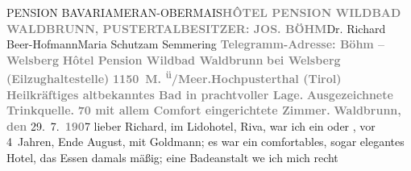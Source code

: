 \begin{ledgroupsized}[t]{13cm}
{{                           PENSION BAVARIAMERAN-OBERMAIS}}\pend{}\pstart{}\textcolor{gray}{\textbf{HÔTEL {\kaufmannsund} PENSION WILDBAD WALDBRUNN, PUSTERTAL}}\pend{}\pstart{}\textcolor{gray}{\textbf{BESITZER: JOS. BÖHM}}\pend{}{\bigskip}\pstart{}Dr. Richard Beer-Hofmann\pend{}\pstart{}Maria Schutz\pend{}\pstart{}am Semmering\pend{}{\bigskip}\pstart
           \noindent{}{\pb}\textcolor{gray}{\textbf{Telegramm-Adresse: Böhm – Welsberg}}\pend
           \pstart
           \textcolor{gray}{\textbf{Hôtel {\kaufmannsund} Pension Wildbad Waldbrunn}}\pend
           \pstart
           \textcolor{gray}{\textbf{bei Welsberg
                     (Eilzughaltestelle)}}\pend
           \pstart
           \textcolor{gray}{\textbf{1150 M. \textsuperscript{ü}/Meer.\hspace*{1.5em}Hochpusterthal (Tirol)}}\pend
           \pstart
           \textcolor{gray}{\textbf{Heilkräftiges altbekanntes Bad in prachtvoller Lage.}}\pend
           \pstart
           \textcolor{gray}{\textbf{Ausgezeichnete Trinkquelle.}}\pend
           \pstart
           \textcolor{gray}{\textbf{70 mit allem Comfort eingerichtete Zimmer.}}\pend
           \pstart
           \raggedleft{}\textcolor{gray}{\textbf{Waldbrunn, den}}{ }29. 7. \textcolor{gray}{\textbf{190}}7\pend
           \pstart{}lieber Richard,\pend\pstart
           im Lidohotel, Riva, war ich ein oder \label{K_L01695_1v}\label{K_L01695_1h}, vor 4 Jahren, Ende August, mit Goldmann; es war ein comfortables, sogar elegantes Hotel, das
               Essen damals mäßig; eine Badeanstalt we{\geminationn} ich mich recht

\end{ledgroupsized}
